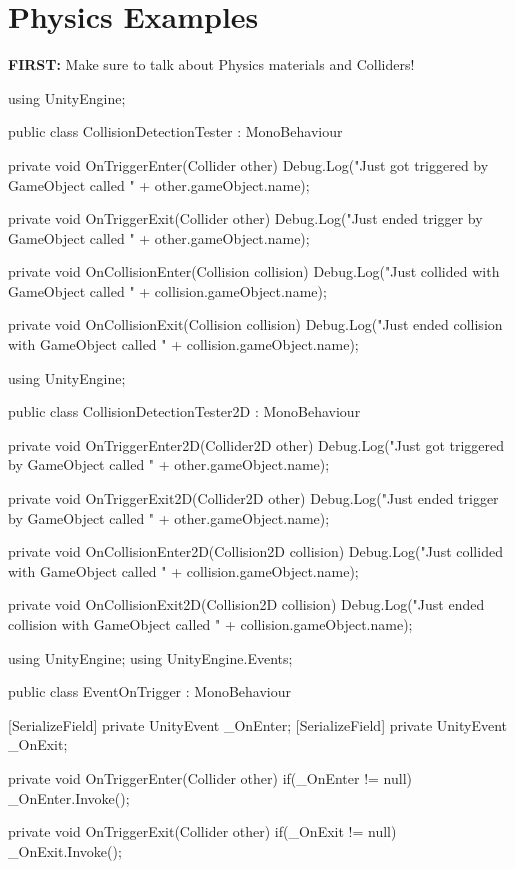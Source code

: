\documentclass[11pt]{article}
\def\StartLineAt#1{\lstset{firstnumber=#1}}
\begin{document}
\section{Physics Examples}

\textbf{FIRST: } Make sure to talk about Physics materials and Colliders!

\StartLineAt{1}
\begin{csharp}
using UnityEngine;

public class CollisionDetectionTester : MonoBehaviour
{
    private void OnTriggerEnter(Collider other)
    {
        Debug.Log("Just got triggered by GameObject called " + other.gameObject.name);
    }

    private void OnTriggerExit(Collider other)
    {
        Debug.Log("Just ended trigger by GameObject called " + other.gameObject.name);
    }

    private void OnCollisionEnter(Collision collision)
    {
        Debug.Log("Just collided with GameObject called " + collision.gameObject.name);
    }

    private void OnCollisionExit(Collision collision)
    {
        Debug.Log("Just ended collision with GameObject called " + collision.gameObject.name);
    }
}
\end{csharp}

\StartLineAt{1}
\begin{csharp}
using UnityEngine;

public class CollisionDetectionTester2D : MonoBehaviour
{
    private void OnTriggerEnter2D(Collider2D other)
    {
        Debug.Log("Just got triggered by GameObject called " + other.gameObject.name);
    }

    private void OnTriggerExit2D(Collider2D other)
    {
        Debug.Log("Just ended trigger by GameObject called " + other.gameObject.name);
    }

    private void OnCollisionEnter2D(Collision2D collision)
    {
        Debug.Log("Just collided with GameObject called " + collision.gameObject.name);
    }

    private void OnCollisionExit2D(Collision2D collision)
    {
        Debug.Log("Just ended collision with GameObject called " + collision.gameObject.name);
    }
}
\end{csharp}

\StartLineAt{1}
\begin{csharp}
using UnityEngine;
using UnityEngine.Events;

public class EventOnTrigger : MonoBehaviour
{
    [SerializeField]
    private UnityEvent _OnEnter;
    [SerializeField]
    private UnityEvent _OnExit;

    private void OnTriggerEnter(Collider other)
    {
        if(_OnEnter != null)
            _OnEnter.Invoke();
    }

    private void OnTriggerExit(Collider other)
    {
        if(_OnExit != null)
            _OnExit.Invoke();
    }
}
\end{csharp}
\end{document}

